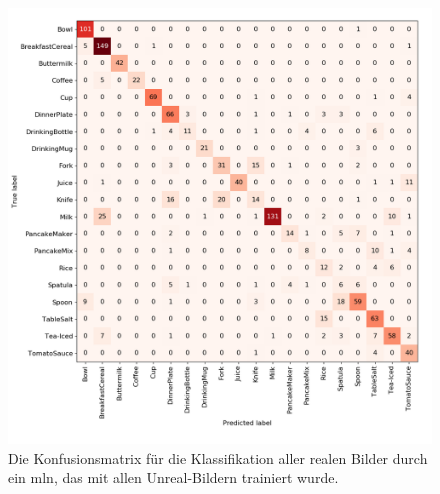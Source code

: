 \begin{figure}
	\includegraphics[scale=.4]{img/chapter6/unrealReal_conf_matrix}
\caption[Konfusionsmatrix der Klassifikation mit Unreal-Trainingsset und Real-Testset]{Die Konfusionsmatrix für die Klassifikation aller realen Bilder durch ein \gls{mln}, das mit allen Unreal-Bildern trainiert wurde.}
\label{fig:unrealRealconfMatrix}
\end{figure}  

